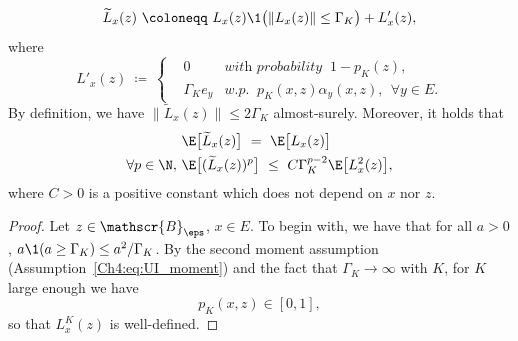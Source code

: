 \begin{refsegment}
\begin{lem}
\begin{equation}\label{Ch4:eq:offspring_distr_coupling}
\widetilde L_x(z)\ \coloneqq\ L_x(z)\1\big(\lVert L_x(z)\rVert\leq \Gamma_K \big)+ L'_x(z),
\end{equation}
where 
\begin{equation*}
L'_x(z)\ \coloneqq\ \left\{\begin{aligned}
  &0 &\textit{with probability }\ 1- p_K(z),\\
  &\Gamma_K e_{y} &\textit{w.p. }\ p_K(x,z)\alpha_y(x,z),\ \ \forall y\in E. 
\end{aligned}\right.
\end{equation*}
By definition, we have $\lVert \widetilde L_x(z)\rVert \leq 2\Gamma_K$ almost-surely. Moreover, it holds that
\begin{align}\label{Ch4:eq:coupling_egalité_esp}
&\E\big[\widetilde L_x(z)\big]\ =\ \E\big[L_x(z)\big]\\ \label{Ch4:eq:controle_moment_sup}
\forall p\in \N,\ &\E\big[(\widetilde L_x(z))^p\big]\ \leq\ C\Gamma_K^{p-2}\E\big[L^2_x(z)\big],
\end{align}
where $C>0$ is a positive constant which does not depend on $x$ nor $z$.
\end{lem}
\begin{proof}
Let $z\in \mathscr{B}_{\eps}$, $x\in E$. To begin with, we have that for all $a>0$, $a\1(a\geq \Gamma_K)\leq a^2/\Gamma_K$. By the second moment assumption (Assumption~\ref{Ch4:eq:UI_moment}) and the fact that $\Gamma_K\to \infty$ with $K$, for $K$ large enough we have
\[
p_K(x,z)\in [0,1],
\]
so that $L^K_x(z)$ is well-defined.


\end{proof}
\end{refsegment}

